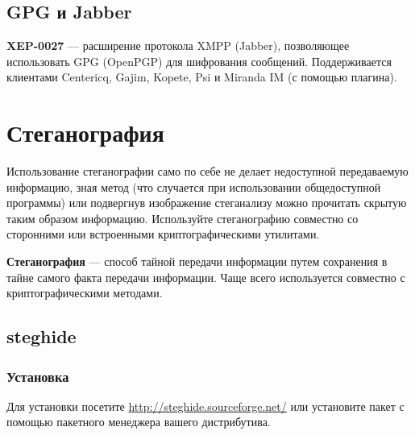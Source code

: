 \subsection{GPG и Jabber}
\textbf{XEP-0027} --- расширение протокола XMPP (Jabber), позволяющее использовать GPG (OpenPGP) для шифрования сообщений\cite{xep-0027}. Поддерживается клиентами Centericq, Gajim, Kopete, Psi и Miranda IM (с помощью плагина).

\section{Стеганография}
\begin{important}
Использование стеганографии само по себе не делает недоступной передаваемую информацию, зная метод (что случается при использовании общедоступной программы) или подвергнув изображение стеганализу можно прочитать скрытую таким образом информацию. Используйте стеганографию совместно со сторонними или встроенными криптографическими утилитами.
\end{important}
\textbf{Стеганография} --- способ тайной передачи информации путем сохранения в тайне самого факта передачи информации. Чаще всего используется совместно с криптографическими методами.
\subsection{steghide}
\subsubsection{Установка}
Для установки посетите \url{http://steghide.sourceforge.net/} или установите пакет с помощью пакетного менеджера вашего дистрибутива.
